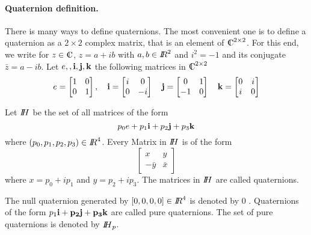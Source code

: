 \paragraph{Quaternion definition.} There is many ways to define quaternions. The most convenient one is to define a quaternion as 
a $2\times 2$ complex matrix, that is an element of $\CC^{2\times 2}$. For this end, we write for $z \in \CC$, $z=a+ib$ with $a,b \in \mbox{\rm $I\!\!R$}^2$ and $i^2=-1$ and its conjugate $\bar z= a-ib$. Let ${e, \bf, i, j, k}$ the following matrices in $\CC^{2\times 2}$
\begin{equation}
  \label{eq:127}
  e =
  \begin{bmatrix}
    1 & 0 \\
    0 & 1  \\
  \end{bmatrix},
  \quad   \bf{i} =
  \begin{bmatrix}
    i & 0 \\
    0 & -i  \\
  \end{bmatrix}
  \quad   \bf{j} =
  \begin{bmatrix}
    0 & 1 \\
    -1 & 0  \\
  \end{bmatrix}
   \quad   \bf{k} =
  \begin{bmatrix}
    0 & i \\
    i & 0  \\
  \end{bmatrix}
\end{equation}

\begin{definition}
  Let $\mbox{\rm $I\!\!H$}$ be the set of all matrices of the form
  \begin{equation}
    \label{eq:128}
    p_0 e + p_1 {\bf i} + p_2 {\bf j} + p_3 {\bf k}
  \end{equation}
  where $(p_0,p_1,p_2,p_3) \in \mbox{\rm $I\!\!R$}^4$. Every Matrix in $\mbox{\rm $I\!\!H$}$ is of the form
  \begin{equation}
    \label{eq:129}
    \begin{bmatrix}
      x &y  \\
      - \bar y  & \bar x
    \end{bmatrix}
  \end{equation}
where $x = p_0 + i p_1$ and $y = p_2 + i p_3$. The matrices in $\mbox{\rm $I\!\!H$}$ are called quaternions. 
\end{definition}


\begin{definition}
  The null quaternion generated by $[0,0,0,0] \in \mbox{\rm $I\!\!R$}^4$ is denoted by $0$ . Quaternions of the form $p_1 \bf {i} + p_2 \bf{j} + p_3 \bf{k}$ are called pure quaternions. The set of pure quaternions is denoted by $\mbox{\rm $I\!\!H$}_p$.
\end{definition}

